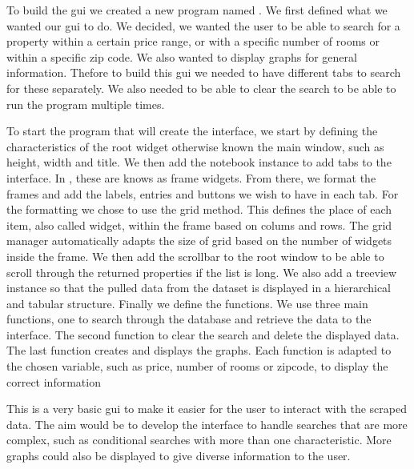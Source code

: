 \documentclass[main]{subfiles}
\begin{document}
To build the \ac{gui} we created a new program named \pkg[main5.py].
We first defined what we wanted our \ac{gui} to do. 
We decided, we wanted the user to be able to search for a property within a certain price range, 
or with a specific number of rooms or within a specific zip code. We also wanted to display graphs for general information.
Thefore to build this \ac{gui} we needed to have different tabs to search for these separately.
We also needed to be able to clear the search to be able to run the program multiple times. \par
To start the program that will create the interface, we start by defining the characteristics of the root widget otherwise known the main window,
such as height, width and title. We then add the notebook instance to add tabs to the interface.
In \pkg[tkinter], these are knows as frame widgets. From there, we format the frames and add the labels, entries and buttons we wish to have in each tab. 
For the formatting we chose to use the grid method. This defines the place of each item, also called widget, within the frame based on colums and rows.
The grid manager automatically adapts the size of grid based on the number of widgets inside the frame. 
We then add the scrollbar to the root window to be able to scroll through the returned properties if the list is long. 
We also add a treeview instance so that the pulled data from the dataset is displayed in a hierarchical and tabular structure. 
Finally we define the functions. We use three main functions, one to search through the database and retrieve the data to the interface. 
The second function to clear the search and delete the displayed data. The last function creates and displays the graphs. 
Each function is adapted to the chosen variable, such as price, number of rooms or zipcode, to display the correct information \par
This is a very basic \ac{gui} to make it easier for the user to interact with the scraped data.
The aim would be to develop the interface to handle searches that are more complex, such as conditional searches with more than one characteristic.
More graphs could also be displayed to give diverse information to the user. 
\end{document}
